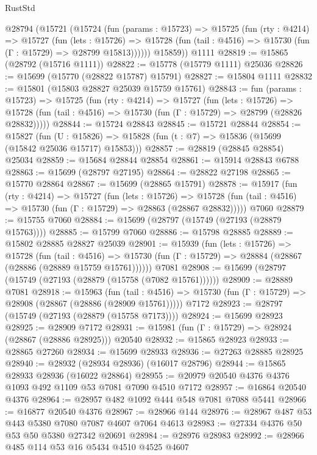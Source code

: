 \begin{lexlean}{RustStd}
\begin{coremodule}
    @28794
      (@15721
        (@15724
          (fun (params : @15723) =>
          @15725
            (fun (rty : @4214) =>
            @15727
              (fun (lets : @15726) =>
              @15728 (fun (tail : @4516) => @15730 (fun (Γ : @15729) => @28799 @15813))))))
        @15859))
    @1111
@28819 := @15865 (@28792 (@15716 @1111))
@28822 := @15778 (@15779 @1111) @25036
@28826 := @15699 (@15770 (@28822 @15787) @15791)
@28827 := @15804 @1111
@28832 := @15801 (@15803 @28827 @25039 @15759 @15761)
@28843 := fun (params : @15723) =>
  @15725
    (fun (rty : @4214) =>
    @15727
      (fun (lets : @15726) =>
      @15728 (fun (tail : @4516) => @15730 (fun (Γ : @15729) => @28799 (@28826 @28832)))))
@28844 := @15724 @28843
@28845 := @15721 @28844
@28854 := @15827
    (fun (U : @15826) => @15828 (fun (t : @7) => @15836 (@15699 (@15842 @25036 @15717) @15853)))
@28857 := @28819 (@28845 @28854) @25034
@28859 := @15684 @28844 @28854
@28861 := @15914 @28843 @6788
@28863 := @15699 (@28797 @27195)
@28864 := @28822 @27198
@28865 := @15770 @28864
@28867 := @15699 (@28865 @15791)
@28878 := @15917
    (fun (rty : @4214) =>
    @15727
      (fun (lets : @15726) =>
      @15728 (fun (tail : @4516) => @15730 (fun (Γ : @15729) => @28863 (@28867 @28832)))))
    @7060
@28879 := @15755 @7060
@28884 := @15699 (@28797 (@15749 (@27193 (@28879 @15763))))
@28885 := @15799 @7060
@28886 := @15798 @28885
@28889 := @15802 @28885 @28827 @25039
@28901 := @15939
    (fun (lets : @15726) =>
    @15728
      (fun (tail : @4516) =>
      @15730 (fun (Γ : @15729) => @28884 (@28867 (@28886 (@28889 @15759 @15761))))))
    @7081
@28908 := @15699 (@28797 (@15749 (@27193 (@28879 (@15758 (@7082 @15761))))))
@28909 := @28889 @7081
@28918 := @15963
    (fun (tail : @4516) => @15730 (fun (Γ : @15729) => @28908 (@28867 (@28886 (@28909 @15761)))))
    @7172
@28923 := @28797 (@15749 (@27193 (@28879 (@15758 @7173))))
@28924 := @15699 @28923
@28925 := @28909 @7172
@28931 := @15981 (fun (Γ : @15729) => @28924 (@28867 (@28886 @28925))) @20540
@28932 := @15865 @28923
@28933 := @28865 @27260
@28934 := @15699 @28933
@28936 := @27263 @28885 @28925
@28940 := @28932 (@28934 @28936) (@16017 @28796)
@28944 := @15865 @28933 @28936 (@16022 @28864)
@28955 := @20979 @20540 @4376 @4376 @1093 @492 @1109 @53 @7081 @7090 @4510 @7172
@28957 := @16864 @20540 @4376
@28964 := @28957 @482 @1092 @444 @548 @7081 @7088 @5441
@28966 := @16877 @20540 @4376
@28967 := @28966 @144
@28976 := @28967 @487 @53 @443 @5380 @7080 @7087 @4607 @7064 @4613
@28983 := @27334 @4376 @50 @53 @50 @5380 @27342 @20691
@28984 := @28976 @28983
@28992 := @28966 @485 @114 @53 @16 @5434 @4510 @4525 @4607

\end{coremodule}
\end{lexlean}
